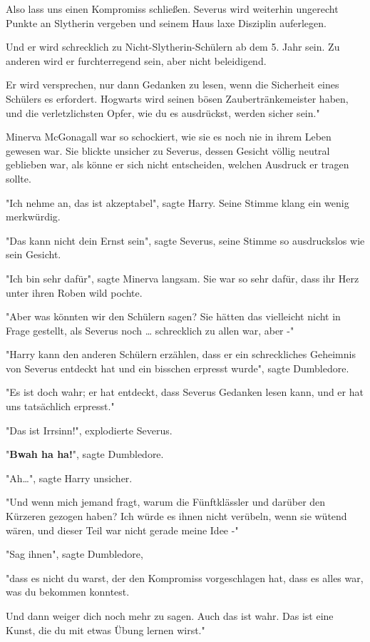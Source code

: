 {Also lass uns einen Kompromiss schließen. Severus wird weiterhin ungerecht Punkte an Slytherin vergeben und seinem Haus laxe Disziplin auferlegen.

Und er wird schrecklich zu Nicht-Slytherin-Schülern ab dem 5. Jahr sein. Zu anderen wird er furchterregend sein, aber nicht beleidigend.

Er wird versprechen, nur dann Gedanken zu lesen, wenn die Sicherheit eines Schülers es erfordert. Hogwarts wird seinen bösen Zaubertränkemeister haben, und die verletzlichsten Opfer, wie du es ausdrückst, werden sicher sein."

Minerva McGonagall war so schockiert, wie sie es noch nie in ihrem Leben gewesen war. Sie blickte unsicher zu Severus, dessen Gesicht völlig neutral geblieben war, als könne er sich nicht entscheiden, welchen Ausdruck er tragen sollte.

"Ich nehme an, das ist akzeptabel", sagte Harry. Seine Stimme klang ein wenig merkwürdig.

"Das kann nicht dein Ernst sein", sagte Severus, seine Stimme so ausdruckslos wie sein Gesicht.

"Ich bin sehr dafür", sagte Minerva langsam. Sie war so sehr dafür, dass ihr Herz unter ihren Roben wild pochte.

"Aber was könnten wir den Schülern sagen? Sie hätten das vielleicht nicht in Frage gestellt, als Severus noch … schrecklich zu allen war, aber -"

"Harry kann den anderen Schülern erzählen, dass er ein schreckliches Geheimnis von Severus entdeckt hat und ein bisschen erpresst wurde", sagte Dumbledore.

"Es ist doch wahr; er hat entdeckt, dass Severus Gedanken lesen kann, und er hat uns tatsächlich erpresst."

"Das ist Irrsinn!", explodierte Severus.

"\textbf{Bwah ha ha!}", sagte Dumbledore.

"Ah…", sagte Harry unsicher.

"Und wenn mich jemand fragt, warum die Fünftklässler und darüber den Kürzeren gezogen haben? Ich würde es ihnen nicht verübeln, wenn sie wütend wären, und dieser Teil war nicht gerade meine Idee -"

"Sag ihnen", sagte Dumbledore,

"dass es nicht du warst, der den Kompromiss vorgeschlagen hat, dass es alles war, was du bekommen konntest.

Und dann weiger dich noch mehr zu sagen. Auch das ist wahr. Das ist eine Kunst, die du mit etwas Übung lernen wirst."

}
